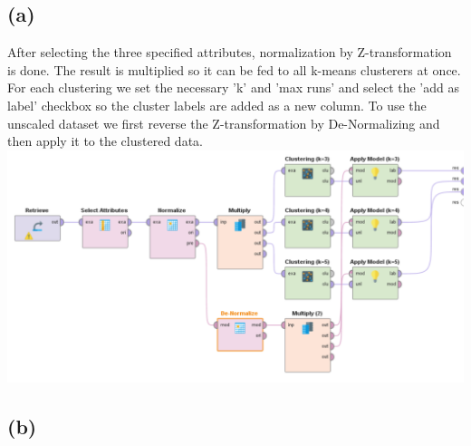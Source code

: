 \documentclass[../../main.tex]{subfiles}
\begin{document}
\subsection*{(a)}
After selecting the three specified attributes, normalization by Z-transformation is done. The result is multiplied so it can be fed to all k-means clusterers at once. For each clustering we set the necessary 'k' and 'max runs' and select the 'add as label' checkbox so the cluster labels are added as a new column. To use the unscaled dataset we first reverse the Z-transformation by De-Normalizing and then apply it to the clustered data.\\  
\includegraphics[width=\textwidth]{img/QUESTION_3a_PROCESS.png}



\subsection*{(b)}
\end{document}

